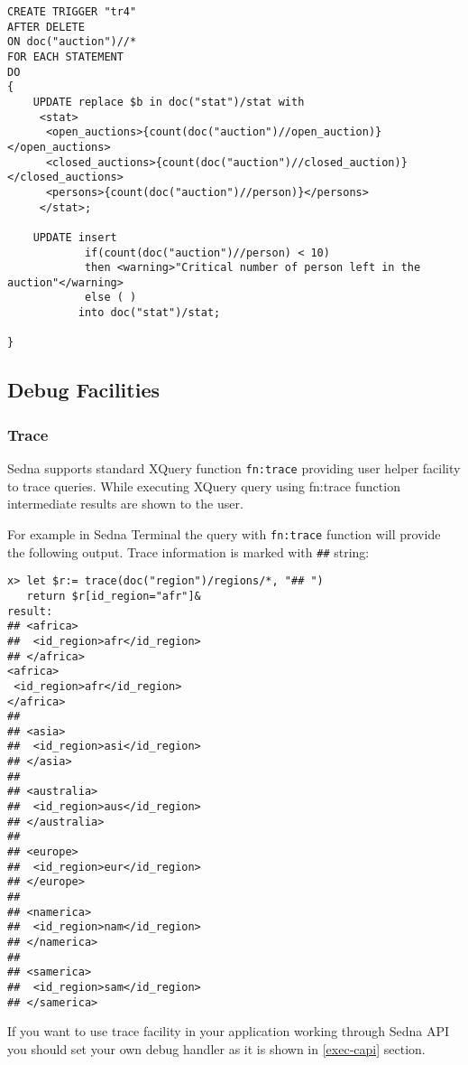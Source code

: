 \documentclass[a4paper,12pt]{article}
\begin{document}
\begin{verbatim}
CREATE TRIGGER "tr4"
AFTER DELETE
ON doc("auction")//*
FOR EACH STATEMENT
DO
{
	UPDATE replace $b in doc("stat")/stat with
	 <stat>
	  <open_auctions>{count(doc("auction")//open_auction)}</open_auctions>
	  <closed_auctions>{count(doc("auction")//closed_auction)}</closed_auctions>
	  <persons>{count(doc("auction")//person)}</persons>
	 </stat>;

	UPDATE insert
	        if(count(doc("auction")//person) < 10)
	        then <warning>"Critical number of person left in the auction"</warning>
	        else ( )
	       into doc("stat")/stat;

}
\end{verbatim}


\subsection{Debug Facilities}
\subsubsection{Trace}
\label{trace}
Sedna supports standard XQuery function \verb!fn:trace! \cite{paper:query-fo} providing user helper facility to trace queries. While executing XQuery query using fn:trace function intermediate results are shown to the user.

For example in Sedna Terminal the query with \verb!fn:trace! function will provide the following output. Trace information is marked with \verb!##! string:

\begin{verbatim}
x> let $r:= trace(doc("region")/regions/*, "## ")
   return $r[id_region="afr"]&
result:
## <africa>
##  <id_region>afr</id_region>
## </africa>
<africa>
 <id_region>afr</id_region>
</africa>
##
## <asia>
##  <id_region>asi</id_region>
## </asia>
##
## <australia>
##  <id_region>aus</id_region>
## </australia>
##
## <europe>
##  <id_region>eur</id_region>
## </europe>
##
## <namerica>
##  <id_region>nam</id_region>
## </namerica>
##
## <samerica>
##  <id_region>sam</id_region>
## </samerica>
\end{verbatim}

If you want to use trace facility in your application working through Sedna API you should set your own debug handler as it is shown in \ref{exec-capi} section.
\end{document}
